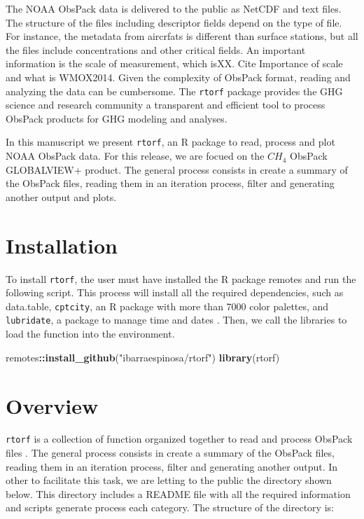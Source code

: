 \documentclass[preprint, 3p,
authoryear]{elsarticle} %
\newenvironment{Shaded}{\begin{snugshade}}{\end{snugshade}}
\newcommand{\FunctionTok}[1]{\textcolor[rgb]{0.13,0.29,0.53}{\textbf{#1}}}
\newcommand{\NormalTok}[1]{#1}
\newcommand{\SpecialCharTok}[1]{\textcolor[rgb]{0.81,0.36,0.00}{\textbf{#1}}}
\newcommand{\StringTok}[1]{\textcolor[rgb]{0.31,0.60,0.02}{#1}}
\begin{document}
The NOAA ObsPack data is delivered to the public as NetCDF and text
files. The structure of the files including descriptor fields depend on
the type of file. For instance, the metadata from aircrfats is different
than surface stations, but all the files include concentrations and
other critical fields. An important information is the scale of
measurement, which isXX. Cite Importance of scale and what is WMOX2014.
Given the complexity of ObsPack format, reading and analyzing the data
can be cumbersome. The \texttt{rtorf} package provides the GHG
science and research community a transparent and efficient tool to
process ObsPack products for GHG modeling and analyses.

In this manuscript we present \texttt{rtorf}, an R package to read,
process and plot NOAA ObsPack data. For this release, we are focued on
the \(CH_4\) ObsPack GLOBALVIEW+ product. The general process consists
in create a summary of the ObsPack files, reading them in an iteration
process, filter and generating another output and plots.

\hypertarget{installation}{%
\section{Installation}\label{installation}}

To install \texttt{rtorf}, the user must have installed the R package
remotes and run the following script. This process will install all the
required dependencies, such as data.table, \texttt{cptcity}, an R
package with more than 7000 color palettes, and \texttt{lubridate}, a
package to manage time and dates \citep{lu, cpt}. Then, we call the
libraries to load the function into the environment.

\begin{Shaded}
\begin{Highlighting}[]
\NormalTok{remotes}\SpecialCharTok{::}\FunctionTok{install\_github}\NormalTok{(}\StringTok{"ibarraespinosa/rtorf"}\NormalTok{)}
\FunctionTok{library}\NormalTok{(rtorf)}
\end{Highlighting}
\end{Shaded}

\hypertarget{overview}{%
\section{Overview}\label{overview}}

\texttt{rtorf} is a collection of function organized together to read
and process ObsPack files \citep{masarie2014obspack}. The general
process consists in create a summary of the ObsPack files, reading them
in an iteration process, filter and generating another output. In other
to facilitate this task, we are letting to the public the directory
shown below. This directory includes a README file with all the required
information and scripts generate process each category. The structure of
the directory is:
\end{document}
